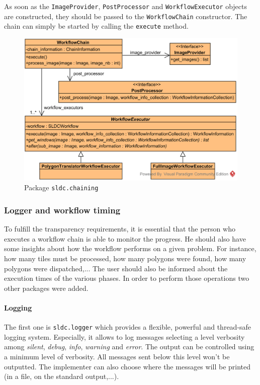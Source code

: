 As soon as the \texttt{ImageProvider}, \texttt{PostProcessor} and \texttt{WorkflowExecutor} objects are constructed, they should be passed to the \texttt{WorkflowChain} constructor. The chain can simply be started by calling the \texttt{execute} method.

\begin{figure}
	\center
	\includegraphics[scale=0.75]{image/uml_chaining.png}
	\caption{Package \texttt{sldc.chaining}}
	\label{fig:uml_chaining}
\end{figure}

\subsubsection{Logger and workflow timing}
To fulfill the transparency requirements, it is essential that the person who executes a workflow chain is able to monitor the progress. He should also have some insights about how the workflow performs on a given problem. For instance, how many tiles must be processed, how many polygons were found, how many polygons were dispatched,... The user should also be informed about the execution times of the various phases. In order to perform those operations two other packages were added. 

\paragraph{Logging} The first one is \texttt{sldc.logger} which provides a flexible, powerful and thread-safe logging system. Especially, it allows to log messages selecting a level verbosity among \textit{silent}, \textit{debug}, \textit{info}, \textit{warning} and \textit{error}. The output can be controlled using a minimum level of verbosity. All messages sent below this level won't be outputted. The implementer can also choose where the messages will be printed (in a file, on the standard output,...).

